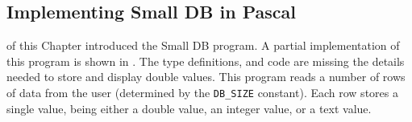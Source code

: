 \subsection{Implementing Small DB in Pascal} %
\label{sub:implementing_small_db_in_pas}

 of this Chapter introduced the Small DB program. A partial implementation of this program is shown in . The type definitions, and code are missing the details needed to store and display double values. This program reads a number of rows of data from the user (determined by the \texttt{DB\_SIZE} constant). Each row stores a single value, being either a double value, an integer value, or a text value.



